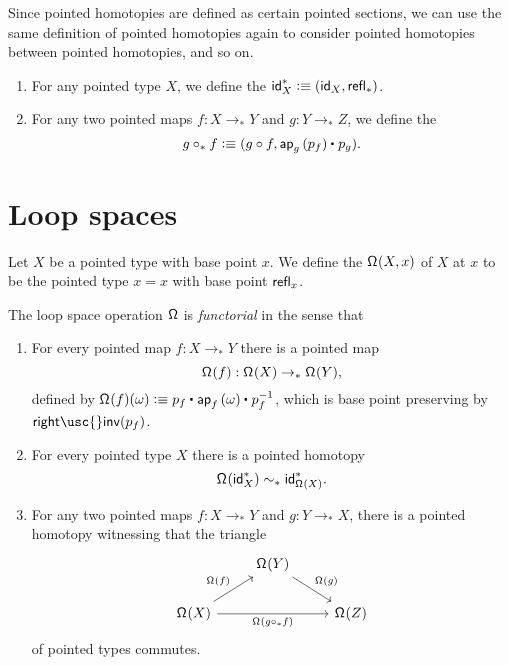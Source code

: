 \begin{rmk}
Since pointed homotopies are defined as certain pointed sections, we can use the same definition of pointed homotopies again to consider pointed homotopies between pointed homotopies, and so on.
\end{rmk}

\begin{defn}
\begin{enumerate}
\item For any pointed type $X$, we define the  $\mathsf{id}^\ast_X\defeq (\idfunc[X],\refl{\ast})$. 
\item For any two pointed maps $f:X\to_\ast Y$ and $g:Y\to_\ast Z$, we define the 
\begin{equation*}
g\mathbin{\circ_\ast} f \defeq (g\circ f,\ct{\ap{g}{p_f}}{p_g}).
\end{equation*}
\end{enumerate}
\end{defn}

\section{Loop spaces}
\begin{defn}
Let $X$ be a pointed type with base point $x$. We define the  $\loopspace{X,x}$ of $X$ at $x$ to be the pointed type $x=x$ with base point $\refl{x}$. 
\end{defn}

\begin{defn}
The loop space operation $\loopspacesym$ is \emph{functorial} in the sense that
\begin{enumerate}
\item For every pointed map $f:X\to_\ast Y$ there is a pointed map
\begin{equation*}
\loopspace{f}:\loopspace{X}\to_\ast \loopspace{Y},
\end{equation*}
defined by $\loopspace{f}(\omega)\defeq \ct{p_f}{\ap{f}{\omega}}{p_f^{-1}}$, which is base point preserving by $\mathsf{right\usc{}inv}(p_f)$. 
\item For every pointed type $X$ there is a pointed homotopy
\begin{equation*}
\loopspace{\mathsf{id}_X^\ast}\htpy_\ast \mathsf{id}^\ast_{\loopspace{X}}.
\end{equation*}
\item For any two pointed maps $f:X\to_\ast Y$ and $g:Y\to_\ast X$, there is a pointed homotopy witnessing that the triangle
\begin{equation*}
\begin{tikzcd}
& \loopspace{Y} \arrow[dr,"\loopspace{g}"] \\
\loopspace{X} \arrow[rr,swap,"\loopspace{g\circ_\ast f}"] \arrow[ur,"\loopspace{f}"] & & \loopspace{Z}
\end{tikzcd}
\end{equation*}
of pointed types commutes.
\end{enumerate}
\end{defn}

